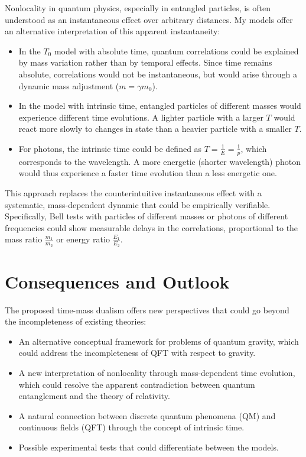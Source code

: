 \documentclass[a4paper,12pt]{article}
\begin{document}
	Nonlocality in quantum physics, especially in entangled particles, is often understood as an instantaneous effect over arbitrary distances. My models offer an alternative interpretation of this apparent instantaneity:
	
	\begin{itemize}
		\item In the $T_0$ model with absolute time, quantum correlations could be explained by mass variation rather than by temporal effects. Since time remains absolute, correlations would not be instantaneous, but would arise through a dynamic mass adjustment ($m = \gamma m_0$).
		
		\item In the model with intrinsic time, entangled particles of different masses would experience different time evolutions. A lighter particle with a larger $T$ would react more slowly to changes in state than a heavier particle with a smaller $T$.
		
		\item For photons, the intrinsic time could be defined as $T = \frac{1}{E} = \frac{1}{p}$, which corresponds to the wavelength. A more energetic (shorter wavelength) photon would thus experience a faster time evolution than a less energetic one.
	\end{itemize}
	
	This approach replaces the counterintuitive instantaneous effect with a systematic, mass-dependent dynamic that could be empirically verifiable. Specifically, Bell tests with particles of different masses or photons of different frequencies could show measurable delays in the correlations, proportional to the mass ratio $\frac{m_1}{m_2}$ or energy ratio $\frac{E_1}{E_2}$.
	
	\section{Consequences and Outlook}
	
	The proposed time-mass dualism offers new perspectives that could go beyond the incompleteness of existing theories:
	
	\begin{itemize}
		\item An alternative conceptual framework for problems of quantum gravity, which could address the incompleteness of QFT with respect to gravity.
		\item A new interpretation of nonlocality through mass-dependent time evolution, which could resolve the apparent contradiction between quantum entanglement and the theory of relativity.
		\item A natural connection between discrete quantum phenomena (QM) and continuous fields (QFT) through the concept of intrinsic time.
		\item Possible experimental tests that could differentiate between the models.
	\end{itemize}
	
\end{document}
